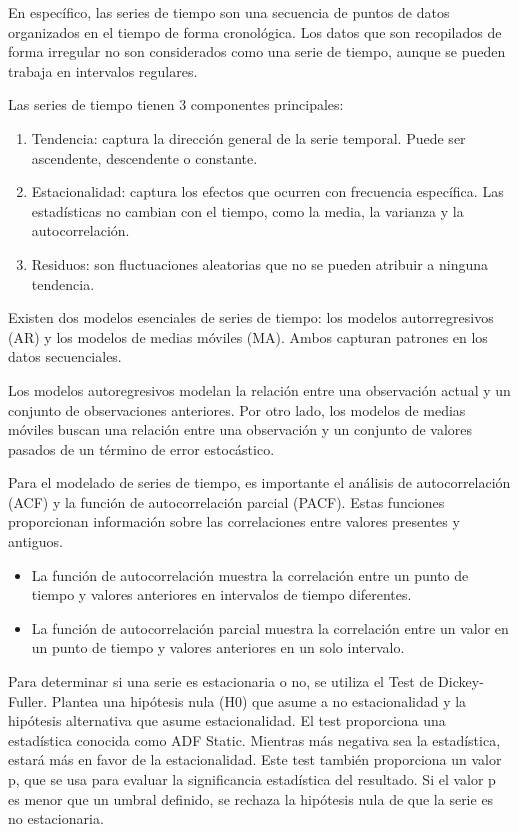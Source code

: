 \documentclass[a4paper, 12pt]{book}
\begin{document}
En específico, las series de tiempo son una secuencia de puntos de datos organizados en el tiempo de forma cronológica. Los datos que son recopilados de forma irregular no son considerados como una serie de tiempo, aunque se pueden trabaja en intervalos regulares.

Las series de tiempo tienen 3 componentes principales:
\begin{enumerate}
	\item Tendencia: captura la dirección general de la serie temporal. Puede ser ascendente, descendente o constante.
	\item Estacionalidad: captura los efectos que ocurren con frecuencia específica. Las estadísticas no cambian con el tiempo, como la media, la varianza y la autocorrelación.
	\item Residuos: son fluctuaciones aleatorias que no se pueden atribuir a ninguna tendencia.
\end{enumerate}

Existen dos modelos esenciales de series de tiempo: los modelos autorregresivos (AR) y los modelos de medias móviles (MA). Ambos capturan patrones en los datos secuenciales.

Los modelos autoregresivos modelan la relación entre una observación actual y un conjunto de observaciones anteriores. Por otro lado, los modelos de medias móviles buscan una relación entre una observación y un conjunto de valores pasados de un término de error estocástico.

Para el modelado de series de tiempo, es importante el análisis de autocorrelación (ACF) y la función de autocorrelación parcial (PACF). Estas funciones proporcionan información sobre las correlaciones entre valores presentes y antiguos.
\begin{itemize}
	\item La función de autocorrelación muestra la correlación entre un punto de tiempo y valores anteriores en intervalos de tiempo diferentes.
	\item La función de autocorrelación parcial muestra la correlación entre un valor en un punto de tiempo y valores anteriores en un solo intervalo.
\end{itemize}

Para determinar si una serie es estacionaria o no, se utiliza el Test de Dickey-Fuller. Plantea una hipótesis nula (H0) que asume a no estacionalidad y la hipótesis alternativa que asume estacionalidad. El test proporciona una estadística conocida como ADF Static. Mientras más negativa sea la estadística, estará más en favor de la estacionalidad. Este test también proporciona un valor p, que se usa para evaluar la significancia estadística del resultado. Si el valor p es menor que un umbral definido, se rechaza la hipótesis nula de que la serie es no estacionaria.
\end{document}
